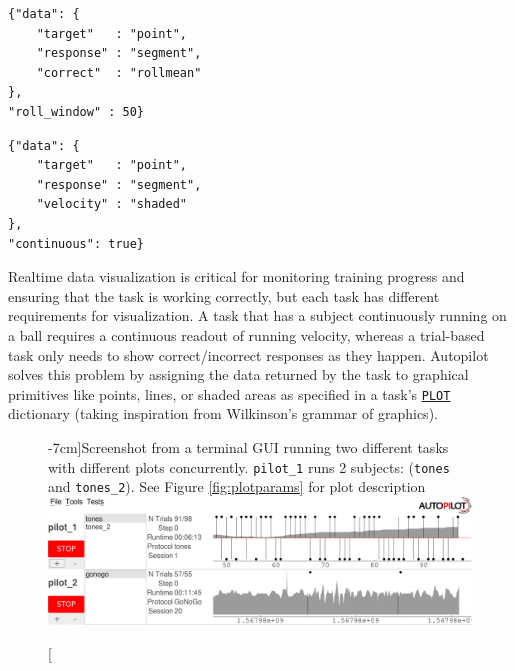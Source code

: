 \begin{marginfigure}[-5.5cm]
\begin{verbatim}
{"data": {
    "target"   : "point",
    "response" : "segment",
    "correct"  : "rollmean"
},
"roll_window" : 50}
\end{verbatim}
\begin{verbatim}
{"data": {
    "target"   : "point",
    "response" : "segment",
    "velocity" : "shaded"
},
"continuous": true}
\end{verbatim}
\caption{\texttt{PLOT} parameters for Figure \ref{fig:gui}. In both, "target" and "response" data are mapped to "point" and "segment" graphical primitives, but timestamps rather than trial numbers are used for the x-axis in the "continuous" plot (Figure \ref{fig:gui}, bottom). Additional parameters can be specified, eg. the trial plot (Figure \ref{fig:gui}, top) computes rolling accuracy over the past 50 trials}
\label{fig:plotparams}
\end{marginfigure}

Realtime data visualization is critical for monitoring training progress and ensuring that the task is working correctly, but each task has different requirements for visualization. A task that has a subject continuously running on a ball requires a continuous readout of running velocity, whereas a trial-based task only needs to show correct/incorrect responses as they happen. Autopilot solves this problem by assigning the data returned by the task to graphical primitives like points, lines, or shaded areas as specified in a task's \hyperref[sec:taskcomponents]{\texttt{PLOT}} dictionary (taking inspiration from Wilkinson's grammar of graphics\citep{wilkinsonGrammarGraphics2012}).%
%
\begin{figure}[hb!]
\caption[][-7cm]{Screenshot from a terminal GUI running two different tasks with different plots concurrently. \texttt{pilot\_1} runs 2 subjects: (\texttt{tones} and \texttt{tones\_2}). See Figure \ref{fig:plotparams} for plot description}
\label{fig:gui}
\includegraphics[]{figures/ss_3.png}
\end{figure}
\clearpage



